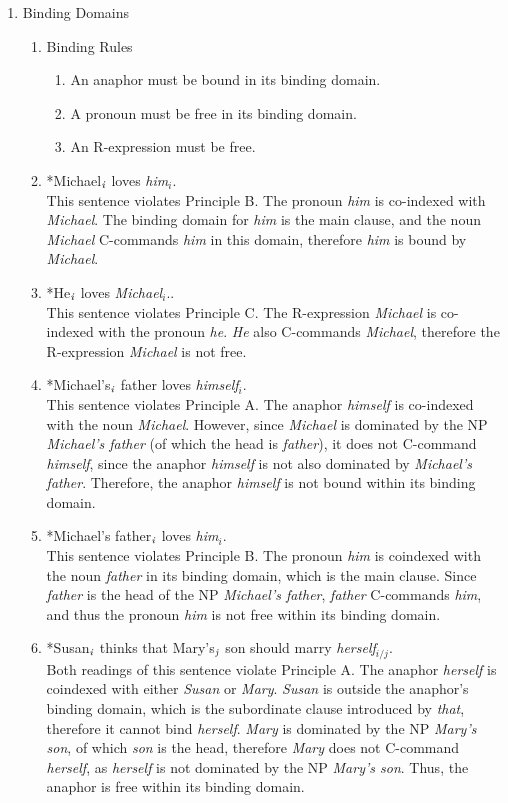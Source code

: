 \documentclass[12pt]{article}
\begin{document}
\begin{enumerate}
\item Binding Domains\\
\begin{enumerate}[label=\arabic*]
\item Binding Rules
\begin{enumerate}[label=(\Alph*)]
\item An anaphor must be bound in its binding domain.
\item A pronoun must be free in its binding domain.
\item An R-expression must be free.
\end{enumerate}
\item *Michael$_{\emph{i}}$ loves \emph{him$_{i}$}.\\
This sentence violates Principle B. The pronoun \emph{him} is co-indexed with \emph{Michael}. The binding domain for \emph{him} is the main clause, and the noun \emph{Michael} C-commands \emph{him} in this domain, therefore \emph{him} is bound by \emph{Michael}.
\item *He$_{\emph{i}}$ loves \emph{Michael$_{i}$}..\\
This sentence violates Principle C. The R-expression \emph{Michael} is co-indexed with the pronoun \emph{he}. \emph{He} also C-commands \emph{Michael}, therefore the R-expression \emph{Michael} is not free.
\item *Michael's$_{\emph{i}}$ father loves \emph{himself$_{i}$}.\\
This sentence violates Principle A. The anaphor \emph{himself} is co-indexed with the noun \emph{Michael}. However, since \emph{Michael} is dominated by the NP \emph{Michael's father} (of which the head is \emph{father}), it does not C-command \emph{himself}, since the anaphor \emph{himself} is not also dominated by \emph{Michael's father}. Therefore, the anaphor \emph{himself} is not bound within its binding domain.
\item *Michael's father$_{\emph{i}}$ loves \emph{him$_{i}$}.\\
This sentence violates Principle B. The pronoun \emph{him} is coindexed with the noun \emph{father} in its binding domain, which is the main clause. Since \emph{father} is the head of the NP \emph{Michael's father}, \emph{father} C-commands \emph{him}, and thus the pronoun \emph{him} is not free within its binding domain.
\item *Susan$_{\emph{i}}$ thinks that Mary's$_{\emph{j}}$ son should marry \emph{herself$_{i/j}$}.\\
Both readings of this sentence violate Principle A. The anaphor \emph{herself} is coindexed with either \emph{Susan} or \emph{Mary}. \emph{Susan} is outside the anaphor's binding domain, which is the subordinate clause introduced by \emph{that}, therefore it cannot bind \emph{herself}. \emph{Mary} is dominated by the NP \emph{Mary's son}, of which \emph{son} is the head, therefore \emph{Mary} does not C-command \emph{herself}, as \emph{herself} is not dominated by the NP \emph{Mary's son}. Thus, the anaphor is free within its binding domain.

\end{enumerate}
\end{enumerate}
\end{document}
